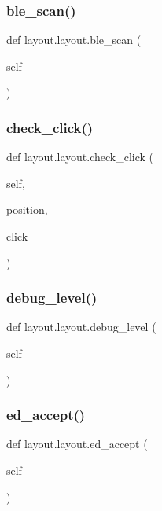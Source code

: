 \subsubsection{\texorpdfstring{ble\+\_\+scan()}{ble\_scan()}}
{\footnotesize\ttfamily def layout.\+layout.\+ble\+\_\+scan (\begin{DoxyParamCaption}\item[{}]{self }\end{DoxyParamCaption})}

\mbox{\label{classlayout_1_1layout_a1a4821d5cfdcbbc1c6bccccf3ee67039}} 
\subsubsection{\texorpdfstring{check\+\_\+click()}{check\_click()}}
{\footnotesize\ttfamily def layout.\+layout.\+check\+\_\+click (\begin{DoxyParamCaption}\item[{}]{self,  }\item[{}]{position,  }\item[{}]{click }\end{DoxyParamCaption})}

\mbox{\label{classlayout_1_1layout_a0f2bebab606bc3a5b8d8556efe9a3769}} 
\subsubsection{\texorpdfstring{debug\+\_\+level()}{debug\_level()}}
{\footnotesize\ttfamily def layout.\+layout.\+debug\+\_\+level (\begin{DoxyParamCaption}\item[{}]{self }\end{DoxyParamCaption})}

\mbox{\label{classlayout_1_1layout_a6bc6dd51cd0974eed07281fb63f8f293}} 
\subsubsection{\texorpdfstring{ed\+\_\+accept()}{ed\_accept()}}
{\footnotesize\ttfamily def layout.\+layout.\+ed\+\_\+accept (\begin{DoxyParamCaption}\item[{}]{self }\end{DoxyParamCaption})}

